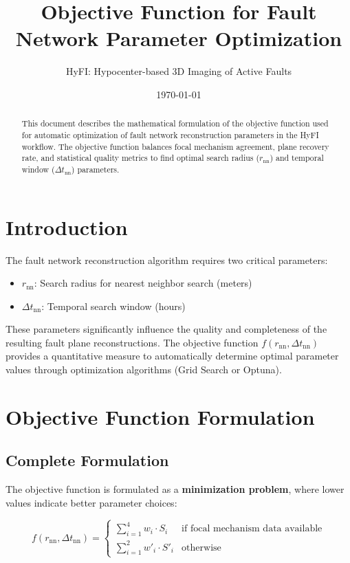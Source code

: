 \documentclass[11pt,a4paper]{article}
\title{Objective Function for Fault Network Parameter Optimization}
\author{HyFI: Hypocenter-based 3D Imaging of Active Faults}
\date{\today}
\begin{document}
\maketitle

\begin{abstract}
This document describes the mathematical formulation of the objective function used for automatic optimization of fault network reconstruction parameters in the HyFI workflow. The objective function balances focal mechanism agreement, plane recovery rate, and statistical quality metrics to find optimal search radius ($r_{\text{nn}}$) and temporal window ($\Delta t_{\text{nn}}$) parameters.
\end{abstract}

\section{Introduction}

The fault network reconstruction algorithm requires two critical parameters:
\begin{itemize}
    \item $r_{\text{nn}}$: Search radius for nearest neighbor search (meters)
    \item $\Delta t_{\text{nn}}$: Temporal search window (hours)
\end{itemize}

These parameters significantly influence the quality and completeness of the resulting fault plane reconstructions. The objective function $f(r_{\text{nn}}, \Delta t_{\text{nn}})$ provides a quantitative measure to automatically determine optimal parameter values through optimization algorithms (Grid Search or Optuna).

\section{Objective Function Formulation}

\subsection{Complete Formulation}

The objective function is formulated as a \textbf{minimization problem}, where lower values indicate better parameter choices:

\begin{equation}
\label{eq:objective_main}
f(r_{\text{nn}}, \Delta t_{\text{nn}}) = 
\begin{cases}
    \displaystyle \sum_{i=1}^{4} w_i \cdot S_i & \text{if focal mechanism data available} \\[10pt]
    \displaystyle \sum_{i=1}^{2} w'_i \cdot S'_i & \text{otherwise}
\end{cases}
\end{equation}
\end{document}
